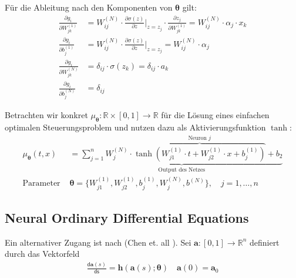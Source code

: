 \documentclass[a4paper, 12pt]{scrartcl}
\begin{document}
Für die Ableitung nach den Komponenten von $\bm{\theta}$ gilt:
\begin{align}
    \frac{\partial g_i}{\partial W_{jk}^{(1)}}
    &=
    W_{ij}^{(N)} 
    \cdot 
    \frac{\partial \sigma(z)}{\partial z} \bigg|_{z = z_j}
    \cdot
    \frac{\partial z_j}{\partial W_{jk}^{(1)}} 
    =
    W_{ij}^{(N)} 
    \cdot 
    \alpha_{j}
    \cdot 
    x_k
    \label{NN:derivative_W1}
    \\
    \frac{\partial g_i}{\partial b^{(1)}_{j}}
    &=
    W_{ij}^{(N)}  
    \cdot 
    \frac{\partial \sigma(z)}{\partial z} \bigg|_{z = z_j}
    =
    W_{ij}^{(N)} \cdot \alpha_{j}
    \label{NN:derivative_b1}
    \\
    \frac{\partial g_i}{\partial W_{jk}^{(N)}}
    &=
    \delta_{ij} \cdot  \sigma(z_k)
    =
    \delta_{ij} \cdot  a_k
    \label{NN:derivative_WN}
    \\
    \frac{\partial g_i}{\partial b^{(N)}_{j}}
    &=
    \delta_{ij}
    \label{NN:derivative_bN}
\end{align}

Betrachten wir konkret $\mu_{\bm{\theta}}:\mathbb{R} \times [0,1] \to \mathbb{R}$ 
für die Lösung eines einfachen optimalen Steuerungsproblem und
nutzen dazu als Aktivierungsfunktion $\tanh$:
%
\begin{align*}
    \mu_{\bm{\theta}}(t,x) 
    &=
    \underbrace{
        \sum_{j=1}^{n}
        W_{j}^{(N)} \cdot
        \overbrace{
            \tanh
            \left(
                W_{j1}^{(1)} \cdot
                t
                +
                W_{j2}^{(1)} \cdot
                x
                +
                b_j^{(1)}
            \right)
        }^{
            \text{Neuron $j$}
        }
        +
        b_2
    }_{
        \text{Output des Netzes}
    }
    \\
    \text{Parameter } & \bm{\theta} 
    = \{  W_{j1}^{(1)}, W_{j2}^{(1)}, b_j^{(1)}, W_j^{(N)}, b^{(N)} \},
    \quad
    j = 1, \ldots, n
\end{align*}

\subsection{Neural Ordinary Differential Equations}

Ein alternativer Zugang ist 
nach (Chen et. all \cite{Chen2018NeuralODE}).
Sei $\bm{a}:[0,1] \to \mathbb{R}^n$ definiert durch das Vektorfeld
%
\begin{align*}
    \frac{\mathsf{d} \bm{a}(s)}{\mathsf{ds}} 
    = 
    \bm{h}(\bm{a}(s); \bm{\theta})
    \quad
    \bm{a}(0) = \bm{a}_0
\end{align*}
\end{document}
